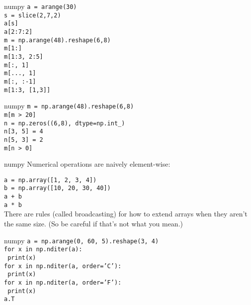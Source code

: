 \begin{frame}{numpy}
  \texttt{a = arange(30)}\\
  \texttt{s = slice(2,7,2)}\\
  \texttt{a[s]}\\[2mm]
  \texttt{a[2:7:2]}\\[5mm]

  \texttt{m = np.arange(48).reshape(6,8)}\\
  \texttt{m[1:]}\\
  \texttt{m[1:3, 2:5]}\\
  \texttt{m[:, 1]}\\
  \texttt{m[..., 1]}\\
  \texttt{m[:, :-1]}\\
  \texttt{m[1:3, [1,3]]}
\end{frame}

\begin{frame}{numpy}
  \texttt{m = np.arange(48).reshape(6,8)}\\
  \texttt{m[m > 20]}\\[5mm]

  \texttt{n = np.zeros((6,8), dtype=np.int\_)}\\
  \texttt{n[3, 5] = 4}\\
  \texttt{n[5, 3] = 2}\\
  \texttt{m[n > 0]}
\end{frame}

\begin{frame}{numpy}
  Numerical operations are naively element-wise:

  \texttt{a = np.array([1, 2, 3, 4])}\\
  \texttt{b = np.array([10, 20, 30, 40])}\\
  \texttt{a + b}\\
  \texttt{a * b}\\[5mm]

  There are rules (called broadcasting) for how to extend arrays when
  they aren't the same size.  (So be careful if that's not what you
  mean.)
\end{frame}

\begin{frame}{numpy}
  \texttt{a = np.arange(0, 60, 5).reshape(3, 4)}\\
  \texttt{for x in np.nditer(a):}\\
  \texttt{    print(x)}\\[5mm]

  \texttt{for x in np.nditer(a, order='C'):}\\
  \texttt{    print(x)}\\[5mm]

  \texttt{for x in np.nditer(a, order='F'):}\\
  \texttt{    print(x)}\\[5mm]

  \texttt{a.T}\\
  
\end{frame}

